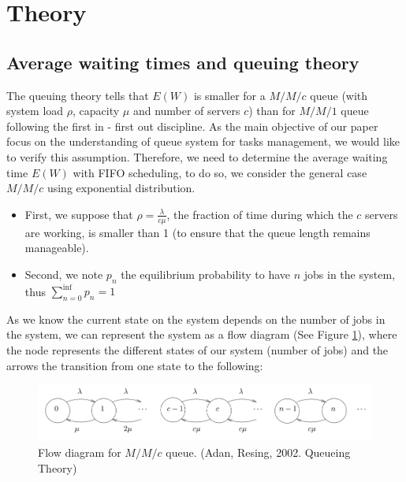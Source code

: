 \documentclass{article}
\begin{document}
    \newpage

    \section{Theory}

    \subsection*{Average waiting times and queuing theory}

    The queuing theory tells that $E(W)$ is smaller for a $M/M/c$ queue (with system load $\rho$, capacity $\mu$ and number of servers $c$) than for $M/M/1$ queue following the first in - first out discipline.
    As the main objective of our paper focus on the understanding of queue system for tasks management, we would like to verify this assumption. Therefore, we need to determine the average waiting time $E(W)$ with FIFO scheduling, to do so, we consider the general case $M/M/c$ using exponential distribution.\\
    \begin{itemize}
        \item First, we suppose that $\rho = \frac{\lambda}{c\mu}$, the fraction of time during which the $c$ servers are working, is smaller than 1 (to ensure that the queue length remains manageable).
        \item Second, we note $p_n$ the equilibrium probability to have $n$ jobs in the system, thus $\sum_{n=0}^{\inf} p_n = 1$
    \end{itemize}

    As we know the current state on the system depends on the number of jobs in the system, we can represent the system as a flow diagram (See Figure \ref{fig:flow_diagram_mmc}), where the node represents the different states of our system (number of jobs) and the arrows the transition from one state to the following:

    \begin{figure}[!ht]
        \centering
        \includegraphics[width=.9\textwidth]{pictures/part_1/flow_diagram_mmc.png}
        \caption{Flow diagram for $M/M/c$ queue. (Adan, Resing, 2002.  Queueing Theory)}
        \label{fig:flow_diagram_mmc}
    \end{figure}
\end{document}
